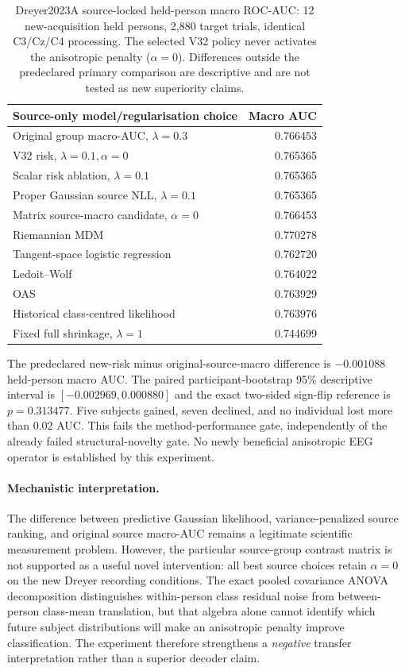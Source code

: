 \begin{table}[ht]\centering\small
\caption{Dreyer2023A source-locked held-person macro ROC-AUC:
12 new-acquisition held persons, 2,880 target trials,
identical C3/Cz/C4 processing. The selected V32 policy
never activates the anisotropic penalty ($\alpha=0$).
Differences outside the predeclared primary comparison
are descriptive and are not tested as new superiority claims.}
\label{tab:v32-dreyer-audit}
\begin{tabular}{lr}
\toprule
Source-only model/regularisation choice & Macro AUC\\
\midrule
Original group macro-AUC, $\lambda=0.3$ & 0.766453\\
V32 risk, $\lambda=0.1,\alpha=0$ & 0.765365\\
Scalar risk ablation, $\lambda=0.1$ & 0.765365\\
Proper Gaussian source NLL, $\lambda=0.1$ & 0.765365\\
Matrix source-macro candidate, $\alpha=0$ & 0.766453\\
Riemannian MDM & 0.770278\\
Tangent-space logistic regression & 0.762720\\
Ledoit--Wolf & 0.764022\\
OAS & 0.763929\\
Historical class-centred likelihood & 0.763976\\
Fixed full shrinkage, $\lambda=1$ & 0.744699\\
\bottomrule
\end{tabular}
\end{table}
The predeclared new-risk minus original-source-macro
difference is $-0.001088$ held-person macro AUC.
The paired participant-bootstrap 95\% descriptive
interval is $[-0.002969,0.000880]$ and the exact
two-sided sign-flip reference is $p=0.313477$.
Five subjects gained, seven declined, and no
individual lost more than 0.02 AUC.
This fails the method-performance gate, independently
of the already failed structural-novelty gate.
No newly beneficial anisotropic EEG operator
is established by this experiment.

\paragraph{Mechanistic interpretation.}
The difference between predictive Gaussian likelihood,
variance-penalized source ranking, and original source
macro-AUC remains a legitimate scientific measurement
problem. However, the particular source-group contrast
matrix is not supported as a useful novel intervention:
all best source choices retain $\alpha=0$ on the new
Dreyer recording conditions. The exact pooled covariance
ANOVA decomposition distinguishes within-person
class residual noise from between-person class-mean
translation, but that algebra alone cannot identify
which future subject distributions will make an
anisotropic penalty improve classification.
The experiment therefore strengthens a \emph{negative}
transfer interpretation rather than a superior
decoder claim.
